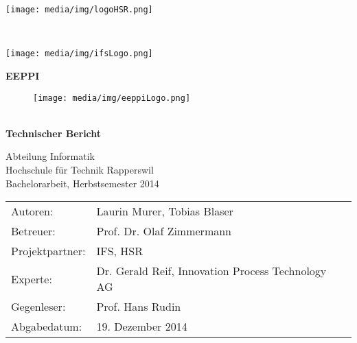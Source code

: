 \begin{titlepage}
	\begin{minipage}{0.5\textwidth}
		\begin{flushleft} \large
			\texttt{[image: media/img/logoHSR.png]}
		\end{flushleft}
	\end{minipage}
	~
	\begin{minipage}{0.5\textwidth}
		\begin{flushright} \large
			\texttt{[image: media/img/ifsLogo.png]}
		\end{flushright}
	\end{minipage}
	
	\vspace*{2cm}
	\begin{center}
		{\fontsize{50}{40} \selectfont \textbf{EEPPI} \\[10mm]}
	
		\begin{figure}[H]
			\centering
			\texttt{[image: media/img/eeppiLogo.png]}
		\end{figure}		
		\vspace*{0.5cm}	
	
		{\fontsize{28}{35} \selectfont \textbf{\project} \\}
		\vspace{0.25cm}
		{\fontsize{22}{40} \selectfont \textbf{Technischer Bericht} \\[10mm]}
	
		{\fontsize{18}{20} \selectfont 
			Abteilung Informatik\\
			Hochschule für Technik Rapperswil \\
				
			{\fontsize{14}{16} \selectfont Bachelorarbeit, Herbstsemester 2014\\}
		}
		
	\end{center}
	
	\vspace*{1.5cm}
	\begin{minipage}[b]{0.4\textwidth}
		\begin{flushleft}
			\begin{tabular}{ll}  
				Autoren: & Laurin Murer, Tobias Blaser \\ 
				Betreuer: & Prof. Dr. Olaf Zimmermann\\ 
				Projektpartner: & IFS, HSR\\
				Experte: & Dr. Gerald Reif, Innovation Process Technology AG\\
				Gegenleser: & Prof. Hans Rudin\\
				Abgabedatum: & 19. Dezember 2014\\
			\end{tabular}
		\end{flushleft}
	\end{minipage}	

\end{titlepage}
